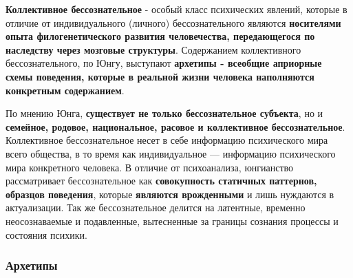 \documentclass{article}
\begin{document}
\begin{flushleft}

\textbf{Коллективное бессознательное} - особый класс психических явлений, которые в отличие от индивидуального (личного) бессознательного являются \textbf{носителями опыта филогенетического развития человечества, передающегося по наследству через мозговые структуры}. Содержанием коллективного бессознательного, по Юнгу, выступают \textbf{архетипы - всеобщие априорные схемы поведения, которые в реальной жизни человека наполняются конкретным содержанием}.

\hfill

По мнению Юнга, \textbf{существует не только бессознательное субъекта}, но и \textbf{семейное, родовое, национальное, расовое и коллективное бессознательное}. Коллективное бессознательное несет в себе информацию психического мира всего общества, в то время как индивидуальное — информацию психического мира конкретного человека. В отличие от психоанализа, юнгианство рассматривает бессознательное как \textbf{совокупность статичных паттернов, образцов поведения}, которые \textbf{являются врожденными} и лишь нуждаются в актуализации. Так же бессознательное делится на латентные, временно неосознаваемые и подавленные, вытесненные за границы сознания процессы и состояния психики.

\end{flushleft}

\subsubsection{Архетипы}
\end{document}
